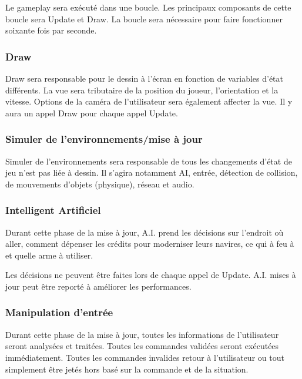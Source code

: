 Le gameplay sera exécuté dans une boucle. Les principaux composants de cette boucle sera Update et Draw. La boucle sera nécessaire pour faire fonctionner soixante fois par seconde.


\subsubsection{Draw} %
\label{ssub:draw}
Draw sera responsable pour le dessin à l'écran en fonction de variables d'état différents. La vue sera tributaire de la position du joueur, l'orientation et la vitesse. Options de la caméra de l'utilisateur sera également affecter la vue. Il y aura un appel Draw pour chaque appel Update.

\subsubsection{Simuler de l'environnements/mise à jour} %
\label{ssub:subsubsection_name}

Simuler de l'environnements sera responsable de tous les changements d'état de jeu n'est pas liée à dessin. Il s'agira notamment AI, entrée, détection de collision, de mouvements d'objets (physique), réseau et audio.



\subsubsection{Intelligent Artificiel} %
\label{ssub:a_i_décisions_}
Durant cette phase de la mise à jour, A.I. prend les décisions sur l'endroit où aller, comment dépenser les crédits pour moderniser leurs navires, ce qui à feu à et quelle arme à utiliser. 

Les décisions ne peuvent être faites lors de chaque appel de Update. A.I. mises à jour peut être reporté à améliorer les performances.


\subsubsection{Manipulation d'entrée} %
\label{ssub:manipulation_d_entrée}

Durant cette phase de la mise à jour, toutes les informations de l'utilisateur seront analysées et traitées. Toutes les commandes validées seront exécutées immédiatement. Toutes les commandes invalides retour à l'utilisateur ou tout simplement être jetés hors basé sur la commande et de la situation. 

